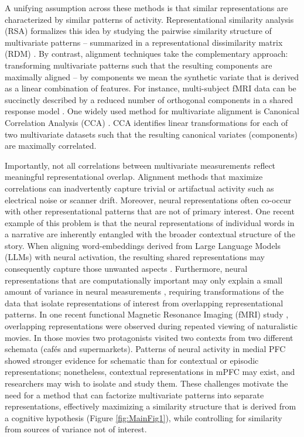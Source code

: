 \documentclass{article}
\begin{document}
A unifying assumption across these methods is that similar representations are characterized by similar patterns of activity. Representational similarity analysis (RSA) formalizes this idea by studying the pairwise similarity structure of multivariate patterns – summarized in a representational dissimilarity matrix (RDM) \cite{kriegeskorteRepresentationalSimilarityAnalysis2008a, palencianoCanonicalTemplateTracking2023}. By contrast, alignment techniques take the complementary approach: transforming multivariate patterns such that the resulting components are maximally aligned -- by components we mean the synthetic variate that is derived as a linear combination of features. For instance, multi-subject fMRI data can be succinctly described by a reduced number of orthogonal components in a shared response model \cite{chenReduceddimensionFMRIShared2015a}. One widely used method for multivariate alignment is Canonical Correlation Analysis (CCA) \cite{zhuangTechnicalReviewCanonical2020, hotellingRELATIONSTWOSETS1936}. CCA identifies linear transformations for each of two multivariate datasets such that the resulting canonical variates (components) are maximally correlated.

Importantly, not all correlations between multivariate measurements reflect meaningful representational overlap. Alignment methods that maximize correlations can inadvertently capture trivial or artifactual activity such as electrical noise or scanner drift. Moreover, neural representations often co-occur with other representational patterns that are not of primary interest. One recent example of this problem is that the neural representations of individual words in a narrative are inherently entangled with the broader contextual structure of the story. When aligning word-embeddings derived from Large Language Models (LLMs) with neural activation, the resulting shared representations may consequently capture those unwanted aspects \cite{goldsteinAlignmentBrainEmbeddings2024,schonmannStimulusDependenciesRather2025}. Furthermore, neural representations that are computationally important may only explain a small amount of variance in neural measurements \cite{lampinenRepresentationBiasesWill2025}, requiring transformations of the data that isolate representations of interest from overlapping representational patterns. In one recent functional Magnetic Resonance Imaging (fMRI) study \cite{reaghFlexibleReuseCorticohippocampal2023a}, overlapping representations were observed during repeated viewing of naturalistic movies. In those movies two protagonists visited two contexts from two different schemata (caf\'es and supermarkets). Patterns of neural activity in medial PFC showed stronger evidence for schematic than for contextual or episodic representations; nonetheless, contextual representations in mPFC may exist, and researchers may wish to isolate and study them. These challenges motivate the need for a method that can factorize multivariate patterns into separate representations, effectively maximizing a similarity structure that is derived from a cognitive hypothesis (Figure \ref{fig:MainFig1}), while controlling for similarity from sources of variance not of interest.
\end{document}
